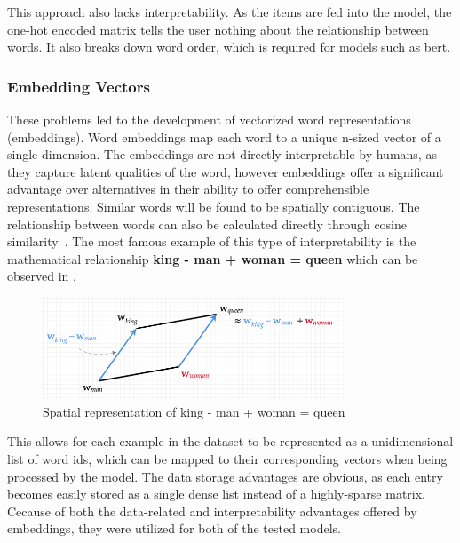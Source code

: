 This approach also lacks interpretability. As the items are fed into the model, the one-hot encoded matrix tells the user nothing about the relationship between words. It also breaks down word order, which is required for models such as \acrshort{bert}.

\subsubsection{Embedding Vectors}
These problems led to the development of vectorized word representations (embeddings). Word embeddings map each word to a unique n-sized vector of a single dimension. The embeddings are not directly interpretable by humans, as they capture latent qualities of the word, however embeddings offer a significant advantage over alternatives in their ability to offer comprehensible representations. Similar words will be found to be spatially contiguous. The relationship between words can also be calculated directly through cosine similarity~\parencite{dot_products_2008}. The most famous example of this type of interpretability is the mathematical relationship \textbf{king - man + woman = queen} which can be observed in .

\begin{figure}[h]
\centering
\includegraphics[width=0.8\textwidth]{fig/king-man-woman-queen.png}
\caption{Spatial representation of king - man + woman = queen~\textcite{king_man_woman_queen}}
\label{fig:king_man_woman_queen_pic}
\end{figure}

This allows for each example in the dataset to be represented as a unidimensional list of word ids, which can be mapped to their corresponding vectors when being processed by the model. The data storage advantages are obvious, as each entry becomes easily stored as a single dense list instead of a highly-sparse matrix. Cecause of both the data-related and interpretability advantages offered by embeddings, they were utilized for both of the tested models.